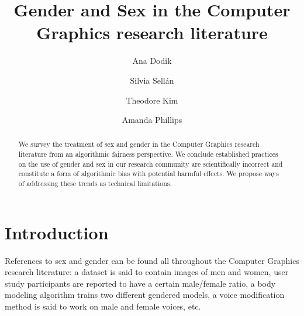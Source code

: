 \documentclass[nonacm,sigconf,review,balance=false]{acmart}
\begin{document}
\title{Gender and Sex in the Computer Graphics research literature}

\author{Ana Dodik}

\author{Silvia Sellán}\authornotemark[1]

\author{Theodore Kim}

\author{Amanda Phillips}



\begin{abstract}
    We survey the treatment of sex and gender in the Computer Graphics research
    literature from an algorithmic fairness perspective. We conclude
    established practices on the use of gender and sex in our research community are scientifically incorrect and constitute a
    form of algorithmic bias with potential harmful effects. We propose ways of addressing these trends as technical limitations.
\end{abstract}


\maketitle

\vspace{-0.1cm}
\section{Introduction}

References to sex and gender can be found all throughout the Computer Graphics research literature: a dataset is said to contain images of men and women, user study participants are reported to have a certain male/female ratio, a body modeling algorithm trains two different gendered models, a voice modification method is said to work on male and female voices, etc.



\end{document}
